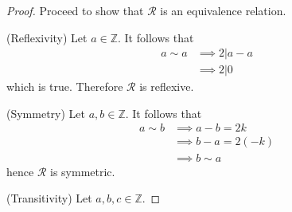 \documentclass[../notes.tex]{subfiles}
\begin{document}
\begin{proof}
	Proceed to show that $\mathcal{R}$ is an equivalence relation.
	\hfill
	\hfill\linebreak

	\quad\begin{minipage}{\dimexpr\textwidth-2cm}
		(Reflexivity) Let $a \in \mathbb{Z}$. It follows that
		\begin{align*}
			a \sim a &\implies 2 \vert a - a \\
			 &\implies 2 \vert 0
		\end{align*}
		which is true. Therefore $\mathcal{R}$ is reflexive.
	\end{minipage}

	\hfill\linebreak

	\quad\begin{minipage}{\dimexpr\textwidth-2cm}
		(Symmetry) Let $a,b \in \mathbb{Z}$. It follows that
		\begin{align*}
			a \sim b &\implies a - b = 2k \\
			 &\implies b - a = 2(-k) \\
			 &\implies b \sim a
		\end{align*}
		hence $\mathcal{R}$ is symmetric.
	\end{minipage}

	\hfill\linebreak

	\quad\begin{minipage}{\dimexpr\textwidth-2cm}
		(Transitivity) Let $a,b,c \in \mathbb{Z}$. 
	\end{minipage}
\end{proof}
\end{document}

